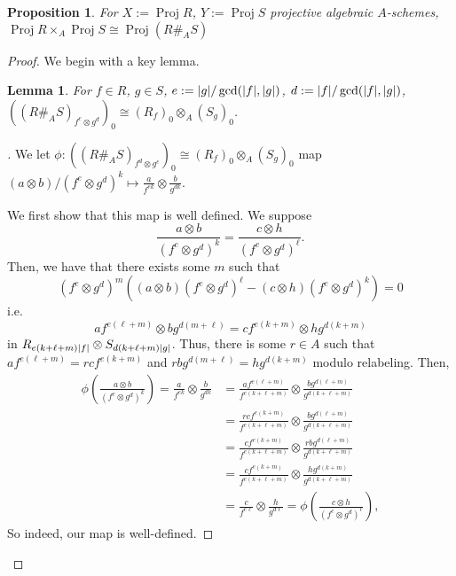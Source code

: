 \documentclass[english,letter,doublesided]{article}
\DeclarePairedDelimiter\abs{\lvert}{\rvert}%
\newenvironment{subproof}[1][\proofname]{%
	\renewcommand{\qedsymbol}{$\blacksquare$}%
	\begin{proof}[#1]%
	}{%
	\end{proof}%
}
\newtheorem{lemma}[thm]{Lemma}
\newtheorem*{prop*}{Proposition}
\theoremstyle{remark}
\theoremstyle{definition}
\DeclareMathOperator{\proj}{Proj}
\begin{document}
	\begin{prop*} For $X:=\proj R$, $Y:=\proj S$ projective algebraic $A$-schemes,
		$\proj R\times_A\proj S\cong \proj (R\#_A S)$
	\end{prop*} \begin{proof} We begin with a key lemma.
		\begin{lemma} For $f\in R$, $g\in S$, $e:=\abs{g}/\gcd(\abs{f},\abs{g})$, $d:=\abs{f}/\gcd(\abs{f},\abs{g})$,
			$((R\#_A S)_{f^e\otimes g^d})_0\cong (R_f)_0\otimes_A (S_g)_0$.
		\end{lemma}
		\begin{subproof}
			We let $\phi:((R\#_A S)_{f^d\otimes g^e})_0\cong (R_f)_0\otimes_A (S_g)_0$ map $(a\otimes b)/(f^e\otimes g^d)^k\mapsto \frac{a}{f^{ek}}\otimes \frac{b}{g^{dk}}$.
			
			We first show that this map is well defined. We suppose $$\frac{a\otimes b}{(f^e\otimes g^d)^k}=\frac{c\otimes h}{(f^e\otimes g^d)^\ell}.$$
			Then, we have that there exists some $m$ such that $$(f^e\otimes g^d)^m\left((a\otimes b)(f^e\otimes g^d)^\ell-(c\otimes h)(f^e\otimes g^d)^k\right)=0$$
			i.e. $$af^{e(\ell+m)}\otimes bg^{d(m+\ell)}=cf^{e(k+m)}\otimes hg^{d(k+m)}$$
			in $R_{e(k+\ell+m)\abs{f}}\otimes S_{d(k+\ell +m)\abs{g}}$. Thus, there is some $r\in A$ such that $af^{e(\ell+m)}=rcf^{e(k+m)}$ and $rbg^{d(m+\ell)}=hg^{d(k+m)}$ modulo relabeling. Then, \begin{align*}
			\phi\left(\frac{a\otimes b}{(f^e\otimes g^d)^k}\right)=\frac{a}{f^{ek}}\otimes \frac{b}{g^{dk}}&=\frac{af^{e(\ell+m)}}{f^{e(k+\ell+m)}}\otimes \frac{bg^{d(\ell+m)}}{g^{d(k+\ell+m)}}\\
			&=\frac{rcf^{e(k+m)}}{f^{e(k+\ell+m)}}\otimes \frac{bg^{d(\ell+m)}}{g^{d(k+\ell+m)}}\\
			&=\frac{cf^{e(k+m)}}{f^{e(k+\ell+m)}}\otimes \frac{rbg^{d(\ell+m)}}{g^{d(k+\ell+m)}}\\
			&=\frac{cf^{e(k+m)}}{f^{e(k+\ell+m)}}\otimes \frac{hg^{d(k+m)}}{g^{d(k+\ell+m)}}\\
			&=\frac{c}{f^{e\ell}}\otimes \frac{h}{g^{d\ell}}=\phi\left(\frac{c\otimes h}{(f^e\otimes g^d)^\ell}\right),
			\end{align*}
			So indeed, our map is well-defined.
			

\end{subproof}
\end{proof}
\end{document}
